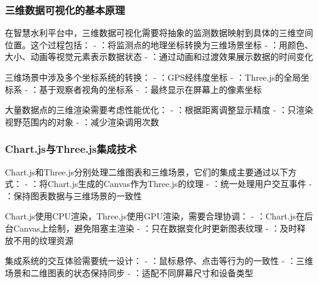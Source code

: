 \hypertarget{ux4e09ux7ef4ux6570ux636eux53efux89c6ux5316ux7684ux57faux672cux539fux7406}{%
\subsubsection{三维数据可视化的基本原理}\label{ux4e09ux7ef4ux6570ux636eux53efux89c6ux5316ux7684ux57faux672cux539fux7406}}


在智慧水利平台中，三维数据可视化需要将抽象的监测数据映射到具体的三维空间位置。这个过程包括： - ：将监测点的地理坐标转换为三维场景坐标 - ：用颜色、大小、动画等视觉元素表示数据状态 - ：通过动画和过渡效果展示数据的时间变化


三维场景中涉及多个坐标系统的转换： - ：GPS经纬度坐标 - ：Three.js的全局坐标系 - ：基于观察者视角的坐标系 - ：最终显示在屏幕上的像素坐标


大量数据点的三维渲染需要考虑性能优化： - ：根据距离调整显示精度 - ：只渲染视野范围内的对象 - ：减少渲染调用次数

\hypertarget{chart.jsux4e0ethree.jsux96c6ux6210ux6280ux672f}{%
\subsubsection{Chart.js与Three.js集成技术}\label{chart.jsux4e0ethree.jsux96c6ux6210ux6280ux672f}}


Chart.js和Three.js分别处理二维图表和三维场景，它们的集成主要通过以下方式： - ：将Chart.js生成的Canvas作为Three.js的纹理 - ：统一处理用户交互事件 - ：保持图表数据与三维场景的一致性


Chart.js使用CPU渲染，Three.js使用GPU渲染，需要合理协调： - ：Chart.js在后台Canvas上绘制，避免阻塞主渲染 - ：只在数据变化时更新图表纹理 - ：及时释放不用的纹理资源


集成系统的交互体验需要统一设计： - ：鼠标悬停、点击等行为的一致性 - ：三维场景和二维图表的状态保持同步 - ：适配不同屏幕尺寸和设备类型

